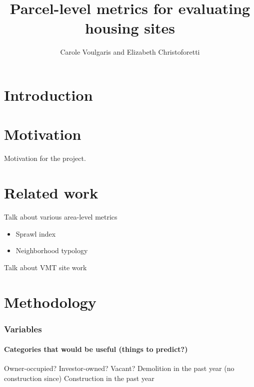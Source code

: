 \documentclass[
]{book}
\title{Parcel-level metrics for evaluating housing sites}
\author{Carole Voulgaris and Elizabeth Christoforetti}
\date{}
\providecommand{\tightlist}{%
  \setlength{\itemsep}{0pt}\setlength{\parskip}{0pt}}
\begin{document}
\maketitle

{
\setcounter{tocdepth}{1}
\tableofcontents
}
\hypertarget{introduction}{%
\chapter{Introduction}\label{introduction}}

\hypertarget{motivation}{%
\chapter{Motivation}\label{motivation}}

Motivation for the project.

\hypertarget{related-work}{%
\chapter{Related work}\label{related-work}}

Talk about various area-level metrics

\begin{itemize}
\tightlist
\item
  Sprawl index
\item
  Neighborhood typology
\end{itemize}

Talk about VMT site work

\hypertarget{methodology}{%
\chapter{Methodology}\label{methodology}}

\hypertarget{variables}{%
\subsection{Variables}\label{variables}}

\hypertarget{categories-that-would-be-useful-things-to-predict}{%
\subsubsection{Categories that would be useful (things to predict?)}\label{categories-that-would-be-useful-things-to-predict}}

Owner-occupied?
Investor-owned?
Vacant?
Demolition in the past year (no construction since)
Construction in the past year
\end{document}
